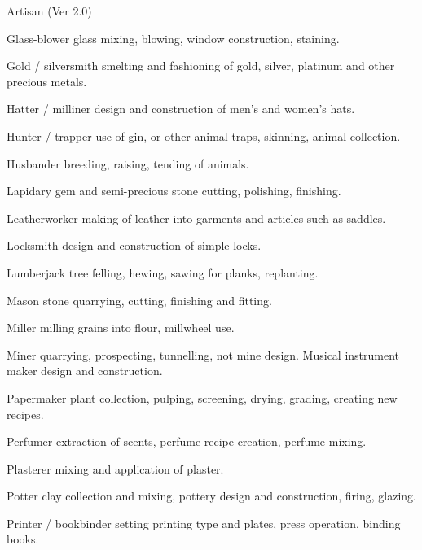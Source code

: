 \begin{Chapter}{Artisan (Ver 2.0)}
\begin{Description}
\item[Glass-blower] glass mixing, blowing, window construction,
  staining.

\item[Gold / silversmith] smelting and fashioning of gold, silver,
  platinum and other precious metals.

\item[Hatter / milliner] design and construction of men’s and women’s
  hats.

\item[Hunter / trapper] use of gin, or other animal traps, skinning,
  animal collection.

\item[Husbander] breeding, raising, tending of animals. 

\item[Lapidary] gem and semi-precious stone cutting, polishing,
  finishing.

\item[Leatherworker] making of leather into garments and articles such
  as saddles.

\item[Locksmith] design and construction of simple locks.

\item[Lumberjack] tree felling, hewing, sawing for planks, replanting.

\item[Mason] stone quarrying, cutting, finishing and fitting.

\item[Miller] milling grains into flour, millwheel use.

\item[Miner] quarrying, prospecting, tunnelling, not mine
  design. Musical instrument maker design and construction.

\item[Papermaker] plant collection, pulping, screening, drying,
  grading, creating new recipes.

\item[Perfumer] extraction of scents, perfume recipe creation, perfume
  mixing.

\item[Plasterer] mixing and application of plaster.

\item[Potter] clay collection and mixing, pottery design and
  construction, firing, glazing.

\item[Printer / bookbinder] setting printing type and plates, press
  operation, binding books.


\end{Description}
\end{Chapter}
